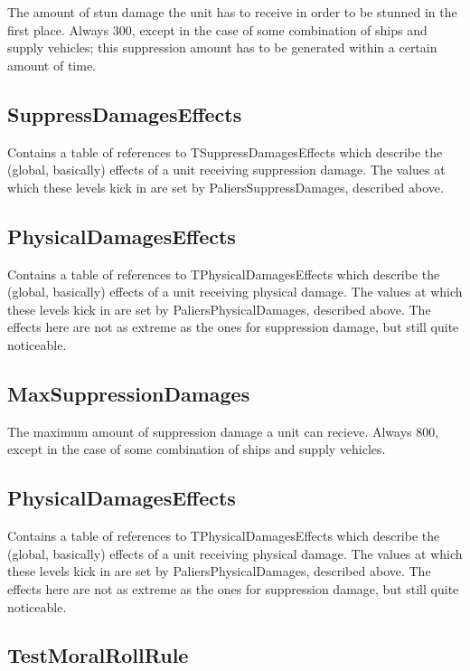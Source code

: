 \documentclass{article}
\begin{document}
The amount of stun damage the unit has to receive in order to be stunned in the first place. Always 300, except in the case of some combination of ships and supply vehicles; this suppression amount has to be generated within a certain amount of time.

\subsection{SuppressDamagesEffects}

Contains a table of references to TSuppressDamagesEffects which describe the (global, basically) effects of a unit receiving suppression damage. The values at which these levels kick in are set by PaliersSuppressDamages, described above.

\subsection{PhysicalDamagesEffects}

Contains a table of references to TPhysicalDamagesEffects which describe the (global, basically) effects of a unit receiving physical damage. The values at which these levels kick in are set by PaliersPhysicalDamages, described above. The effects here are not as extreme as the ones for suppression damage, but still quite noticeable.

\subsection{MaxSuppressionDamages}

The maximum amount of suppression damage a unit can recieve. Always 800, except in the case of some combination of ships and supply vehicles.

\subsection{PhysicalDamagesEffects}

Contains a table of references to TPhysicalDamagesEffects which describe the (global, basically) effects of a unit receiving physical damage. The values at which these levels kick in are set by PaliersPhysicalDamages, described above. The effects here are not as extreme as the ones for suppression damage, but still quite noticeable.

\subsection{TestMoralRollRule}
\end{document}
